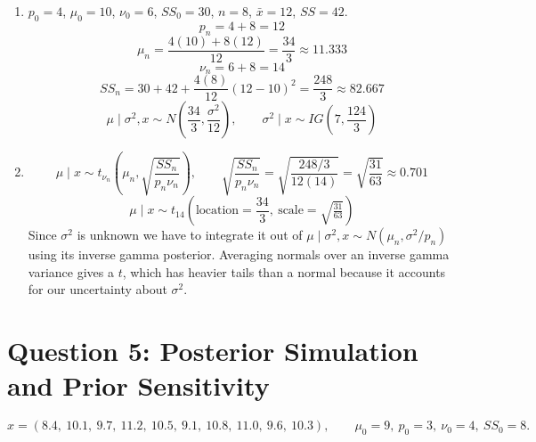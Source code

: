 \documentclass[11pt]{article}
\begin{document}
\begin{enumerate}
The difference between prior and sample mean is squared, so when they strongly disagree this term gets big, which increases our posterior variance scale.

\item $p_0 = 4$, $\mu_0 = 10$, $\nu_0 = 6$, $SS_0 = 30$, $n = 8$, $\bar{x} = 12$, $SS = 42$.
\[
\boxed{p_n = 4 + 8 = 12}
\]
\[
\boxed{\mu_n = \frac{4(10) + 8(12)}{12} = \frac{34}{3} \approx 11.333}
\]
\[
\boxed{\nu_n = 6 + 8 = 14}
\]
\[
\boxed{SS_n = 30 + 42 + \frac{4(8)}{12}(12 - 10)^2 = \frac{248}{3} \approx 82.667}
\]
\[
\boxed{\mu \mid \sigma^2, x \sim N\left(\frac{34}{3}, \frac{\sigma^2}{12}\right)}, \qquad
\boxed{\sigma^2 \mid x \sim IG\left(7, \frac{124}{3}\right)}
\]

\item
\[
\mu \mid x \sim t_{\nu_n}\left(\mu_n, \sqrt{\frac{SS_n}{p_n\nu_n}}\right), \qquad
\sqrt{\frac{SS_n}{p_n\nu_n}} = \sqrt{\frac{248/3}{12(14)}} = \sqrt{\frac{31}{63}} \approx 0.701
\]
\[
\boxed{\mu \mid x \sim t_{14}\left(\text{location} = \frac{34}{3},\ \text{scale} = \sqrt{\tfrac{31}{63}}\right)}
\]
Since $\sigma^2$ is unknown we have to integrate it out of $\mu \mid \sigma^2, x \sim N(\mu_n, \sigma^2/p_n)$ using its inverse gamma posterior. Averaging normals over an inverse gamma variance gives a $t$, which has heavier tails than a normal because it accounts for our uncertainty about $\sigma^2$.
\end{enumerate}

\section*{Question 5: Posterior Simulation and Prior Sensitivity}

\[
x = (8.4,\ 10.1,\ 9.7,\ 11.2,\ 10.5,\ 9.1,\ 10.8,\ 11.0,\ 9.6,\ 10.3), \qquad
\mu_0 = 9,\ p_0 = 3,\ \nu_0 = 4,\ SS_0 = 8.
\]
\end{document}
